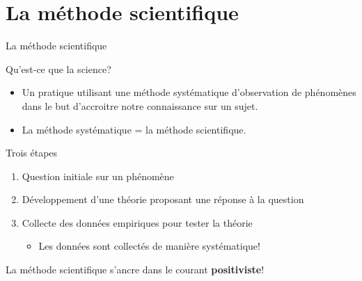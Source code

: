 \documentclass[10pt]{beamer}
\begin{document}
\section{La méthode scientifique}


\begin{frame}{La méthode scientifique}
     {
        \begin{block}{Qu'est-ce que la science?}
            \begin{itemize}
                \item <2-> Un pratique utilisant une méthode systématique d'observation de phénomènes dans le but d'accroitre notre connaissance sur un sujet.
                \item <3-> La méthode systématique = la méthode scientifique.
            \end{itemize}
        \end{block}
    }
     {
        \begin{block}{Trois étapes}
            \begin{enumerate}
                \item <5-> Question initiale sur un phénomène
                \item <5-> Développement d'une théorie proposant une réponse à la question
                \item <5-> Collecte des données empiriques pour tester la théorie
                    \begin{itemize}
                        \item Les données sont collectés de manière systématique!
                    \end{itemize}
            \end{enumerate}
        \end{block}
    }
     La méthode scientifique s'ancre dans le courant \textbf{positiviste}!
\end{frame}
\end{document}
